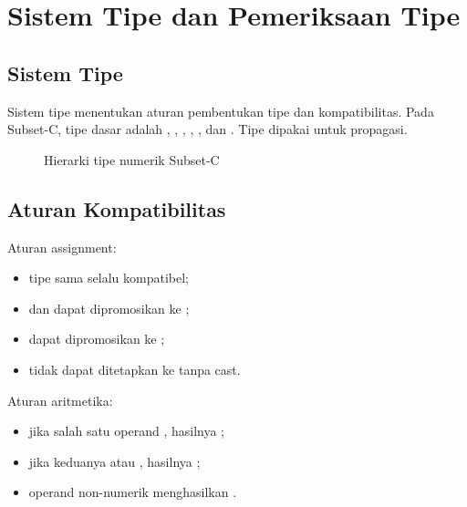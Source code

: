\section{Sistem Tipe dan Pemeriksaan Tipe}
\label{sec:ch15-tipe}

\subsection{Sistem Tipe}

Sistem tipe menentukan aturan pembentukan tipe dan kompatibilitas.
Pada Subset-C, tipe dasar adalah , ,
, , , dan .
Tipe  dipakai untuk propagasi.

\begin{figure}[H]
\centering
{}
\caption{Hierarki tipe numerik Subset-C}
\label{fig:ch15-tipe}
\end{figure}

\subsection{Aturan Kompatibilitas}

Aturan assignment:
\begin{itemize}[leftmargin=*]
  \item tipe sama selalu kompatibel;
  \item {} dan  dapat dipromosikan ke
        ;
  \item {} dapat dipromosikan ke ;
  \item {} tidak dapat ditetapkan ke  tanpa cast.
\end{itemize}

Aturan aritmetika:
\begin{itemize}[leftmargin=*]
  \item jika salah satu operand , hasilnya ;
  \item jika keduanya  atau , hasilnya
        ;
  \item operand non-numerik menghasilkan .
\end{itemize}

